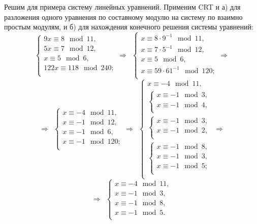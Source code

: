 \example
Решим для примера систему линейных уравнений. Применим CRT и а) для разложения одного уравнения по составному модулю на систему по взаимно простым модулям, и б) для нахождения конечного решения системы уравнений:
\[
    \begin{cases}
        9 x \equiv 8 \mod 11, \\
        5 x \equiv 7 \mod 12, \\
        x \equiv 5 \mod 6, \\
        122 x \equiv 118 \mod 240; \\
    \end{cases}
    \Rightarrow ~~
    \begin{cases}
        x \equiv 8 \cdot 9^{-1} \mod 11, \\
        x \equiv 7 \cdot 5^{-1} \mod 12, \\
        x \equiv 5 \mod 6, \\
        x \equiv 59 \cdot 61^{-1} \mod 120; \\
    \end{cases}
    \Rightarrow
\] \[
    \Rightarrow ~~
    \begin{cases}
        x \equiv -4 \mod 11, \\
        x \equiv -1 \mod 12, \\
        x \equiv -1 \mod 6, \\
        x \equiv -1 \mod 120; \\
    \end{cases}
    \Rightarrow ~~
    \begin{cases}
        x \equiv -4 \mod 11, \\
        \begin{cases}
            x \equiv -1 \mod 3, \\
            x \equiv -1 \mod 4, \\
        \end{cases} \\
        \begin{cases}
            x \equiv -1 \mod 3, \\
            x \equiv -1 \mod 2, \\
        \end{cases} \\
        \begin{cases}
            x \equiv -1 \mod 8, \\
            x \equiv -1 \mod 3, \\
            x \equiv -1 \mod 5; \\
        \end{cases} \\
    \end{cases}
    \Rightarrow
\] \[
    \Rightarrow ~~
    \begin{cases}
        x \equiv -4 \mod 11, \\
        x \equiv -1 \mod 3, \\
        x \equiv -1 \mod 8, \\
        x \equiv -1 \mod 5. \\
    \end{cases}
\]

